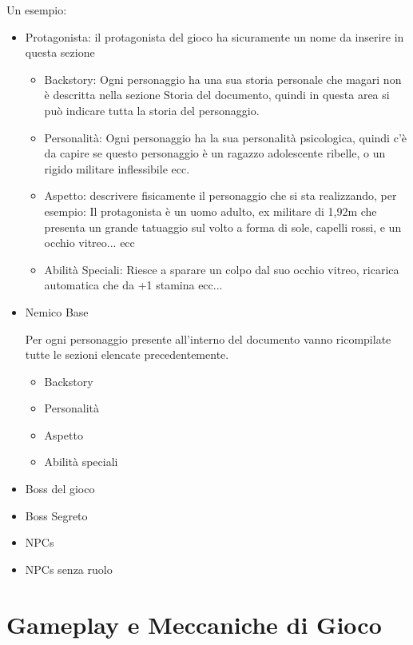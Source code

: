 \documentclass{report}
\begin{document}
Un esempio:
\begin{itemize}
    \item Protagonista: il protagonista del gioco ha sicuramente un nome da inserire in questa sezione
        \begin{itemize}
            \item Backstory: Ogni personaggio ha una sua storia personale che magari non è descritta nella sezione Storia del documento, quindi in questa area si può indicare tutta la storia del personaggio.
            \item Personalità: Ogni personaggio ha la sua personalità psicologica, quindi c'è da capire se questo personaggio è un ragazzo adolescente ribelle, o un rigido militare inflessibile ecc.
            \item Aspetto: descrivere fisicamente il personaggio che si sta realizzando, per esempio: Il protagonista è un uomo adulto, ex militare di 1,92m che presenta un grande tatuaggio sul volto a forma di sole, capelli rossi, e un occhio vitreo... ecc
            \item Abilità Speciali: Riesce a sparare un colpo dal suo occhio vitreo, ricarica automatica che da +1 stamina ecc...
        \end{itemize}
    \item Nemico Base

    Per ogni personaggio presente all'interno del documento vanno ricompilate tutte le sezioni elencate precedentemente.
    \begin{itemize}
        \item Backstory
        \item Personalità
        \item Aspetto
        \item Abilità speciali
    \end{itemize}
    \item Boss del gioco
    \item Boss Segreto
    \item NPCs
    \item NPCs senza ruolo
\end{itemize}

\newpage

\section{Gameplay e Meccaniche di Gioco}
\end{document}
